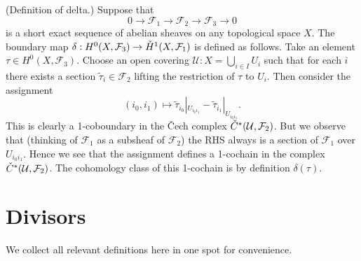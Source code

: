 \begin{definition}
\label{definition-delta}
(Definition of delta.) Suppose that
$$
0 \to {\mathcal F}_1 \to {\mathcal F}_2 \to {\mathcal F}_3 \to 0
$$
is a short exact sequence of abelian sheaves on any topological space $X$.
The boundary map
$\delta : H^0(X, {\mathcal F}_3) \to {\mathaccent 20 H}^1(X, {\mathcal F}_1)$
is defined as follows. Take an element $\tau \in H^0(X, {\mathcal F}_3)$.
Choose an open covering ${\mathcal U} : X = \bigcup_{i\in I} U_i$ such
that for each $i$ there exists a section $\tilde \tau_i \in {\mathcal F}_2$
lifting the restriction of $\tau$ to $U_i$. Then consider the assignment
$$
(i_0, i_1) \longmapsto
\tilde \tau_{i_0}|_{U_{i_0i_1}} - \tilde \tau_{i_1}|_{U_{i_0i_1}}.
$$
This is clearly a 1-coboundary in the {\v C}ech complex
${\mathaccent 20 C}^\ast({\mathcal U}, {\mathcal F}_2)$. But we observe that
(thinking of ${\mathcal F}_1$ as a subsheaf of ${\mathcal F}_2$) the RHS
always is a section of ${\mathcal F}_1$ over $U_{i_0i_1}$. Hence we
see that the assignment defines a 1-cochain in the complex
${\mathaccent 20 C}^\ast({\mathcal U}, {\mathcal F}_2)$. The cohomology
class of this 1-cochain is by definition {\it $\delta(\tau)$}.
\end{definition}



\section{Divisors}
\label{section-divisors}

\noindent
We collect all relevant definitions here in one spot for convenience.

